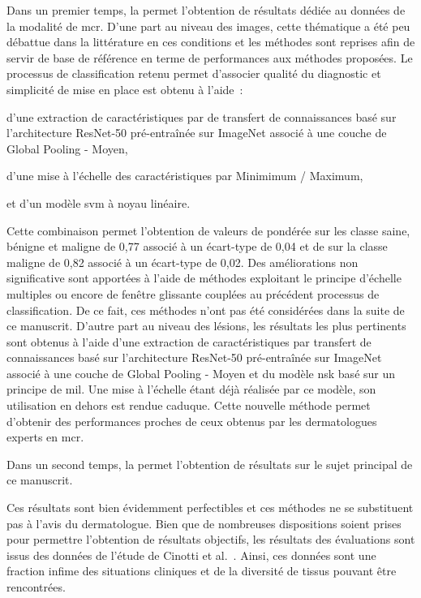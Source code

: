 Dans un premier temps, la  permet l'obtention de résultats dédiée au données de la modalité de \gls{mcr}. D'une part au niveau des images, cette thématique a été peu débattue dans la littérature en ces conditions et les méthodes sont reprises afin de servir de base de référence en terme de performances aux méthodes proposées. Le processus de classification retenu permet d'associer qualité du diagnostic et simplicité de mise en place est obtenu à l'aide~:
\begin{inlinerate}
    \item d'une extraction de caractéristiques par de transfert de connaissances basé sur l'architecture ResNet-50 pré-entraînée sur ImageNet associé à une couche de Global Pooling - Moyen,
    \item d'une mise à l'échelle des caractéristiques par Minimimum / Maximum,
    \item et d'un modèle \gls{svm} à noyau linéaire.
\end{inlinerate} Cette combinaison permet l'obtention de valeurs de \fscore{} pondérée sur les classe saine, bénigne et maligne de 0,77 associé à un écart-type de 0,04 et de \fscore{} sur la classe maligne de 0,82 associé à un écart-type de 0,02. Des améliorations non significative sont apportées à l'aide de méthodes exploitant le principe d'échelle multiples ou encore de fenêtre glissante couplées au précédent processus de classification. De ce fait, ces méthodes n'ont pas été considérées dans la suite de ce manuscrit. D'autre part au niveau des lésions, les résultats les plus pertinents sont obtenus à l'aide d'une extraction de caractéristiques par transfert de connaissances basé sur l'architecture ResNet-50 pré-entraînée sur ImageNet associé à une couche de Global Pooling - Moyen et du modèle \gls{nsk} basé sur un principe de \gls{mil}. Une mise à l'échelle étant déjà réalisée par ce modèle, son utilisation en dehors est rendue caduque. Cette nouvelle méthode permet d'obtenir des performances proches de ceux obtenus par les dermatologues experts en \gls{mcr}.\par

Dans un second temps, la  permet l'obtention de résultats sur le sujet principal de ce manuscrit.\par

Ces résultats sont bien évidemment perfectibles et ces méthodes ne se substituent pas à l'avis du dermatologue. Bien que de nombreuses dispositions soient prises pour permettre l'obtention de résultats objectifs, les résultats des évaluations sont issus des données de l'étude de Cinotti et al.~\cite{Cinotti2016}. Ainsi, ces données sont une fraction infime des situations cliniques et de la diversité de tissus pouvant être rencontrées.\par
\clearpage

